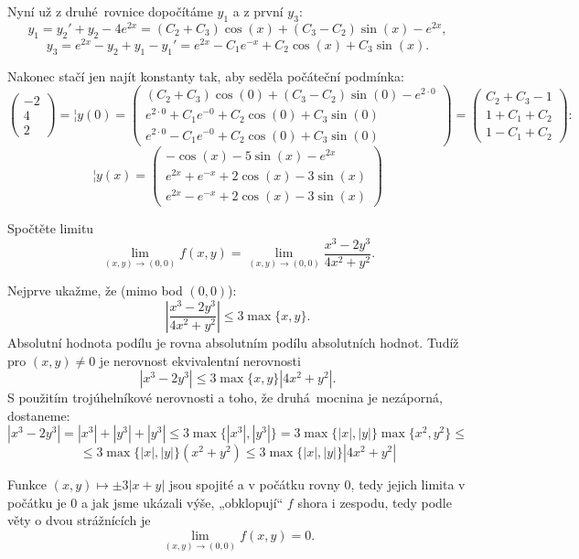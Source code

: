 \documentclass[12pt]{article}                   %
\begin{document}
\begin{priklad}[1.1]
\begin{reseni}
		Nyní už z druhé rovnice dopočítáme $y_1$ a z první $y_3$:
		$$ y_1 = y_2' + y_2 - 4e^{2x} = (C_2 + C_3)\cos(x) + (C_3 - C_2)\sin(x) - e^{2x}, $$
		$$ y_3 = e^{2x} - y_2 + y_1 - y_1' = e^{2x} - C_1e^{-x} + C_2\cos(x) + C_3\sin(x). $$

		Nakonec stačí jen najít konstanty tak, aby seděla počáteční podmínka:
		$$ \begin{pmatrix} -2 \\ 4 \\ 2 \end{pmatrix} = ¦y(0) = \begin{pmatrix} (C_2 + C_3)\cos(0) + (C_3 - C_2)\sin(0) - e^{2·0} \\ e^{2·0} + C_1e^{-0} + C_2\cos(0) + C_3\sin(0) \\ e^{2·0} - C_1e^{-0} + C_2\cos(0) + C_3\sin(0) \end{pmatrix} = \begin{pmatrix} C_2 + C_3 - 1 \\ 1 + C_1 + C_2 \\ 1 - C_1 + C_2 \end{pmatrix}: $$
		$$ ¦y(x) = \begin{pmatrix} - \cos(x) - 5\sin(x) - e^{2x} \\ e^{2x} + e^{-x} + 2\cos(x) - 3\sin(x) \\ e^{2x} - e^{-x} + 2\cos(x) - 3\sin(x) \end{pmatrix}  $$
	\end{reseni}
\end{priklad}

\begin{priklad}[1.2]
	Spočtěte limitu
	$$ \lim_{(x, y) \rightarrow (0, 0)} f(x, y) = \lim_{(x, y) \rightarrow (0, 0)} \frac{x^3 - 2y^3}{4x^2 + y^2}. $$

	\begin{reseni}
		Nejprve ukažme, že (mimo bod $(0, 0)$):
		$$ \left|\frac{x^3 - 2y^3}{4x^2 + y^2}\right| ≤ 3\max\{x, y\}. $$
		Absolutní hodnota podílu je rovna absolutním podílu absolutních hodnot. Tudíž pro $(x, y) ≠ 0$ je nerovnost ekvivalentní nerovnosti
	$$ \left|x^3 - 2y^3\right| ≤ 3\max\{x, y\}\left|4x^2 + y^2\right|. $$
		S použitím trojúhelníkové nerovnosti a toho, že druhá mocnina je nezáporná, dostaneme:
		$$ \left|x^3 - 2y^3\right| = \left|x^3\right| + \left|y^3\right| + \left|y^3\right| ≤ 3\max\{\left|x^3\right|, \left|y^3\right|\} = 3\max\{|x|, |y|\}\max\{x^2, y^2\} ≤ $$
		$$ ≤ 3\max\{|x|, |y|\}\left(x^2 + y^2\right) ≤  3\max\{|x|, |y|\}\left|4x^2 + y^2\right| $$

		Funkce $(x, y) \mapsto ±3|x + y|$ jsou spojité a v počátku rovny $0$, tedy jejich limita v počátku je $0$ a jak jsme ukázali výše, „obklopují“ $f$ shora i zespodu, tedy podle věty o dvou strážnících je
		$$ \lim_{(x, y) \rightarrow (0, 0)} f(x, y) = 0. $$
	\end{reseni}
\end{priklad}
\end{document}
